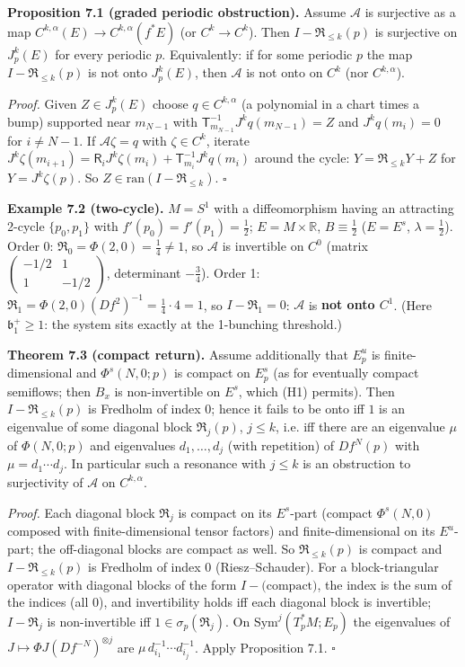 \documentclass[11pt,a4paper]{article}
\theoremstyle{plain}
\theoremstyle{definition}
\theoremstyle{remark}
\numberwithin{equation}{section}
\numberwithin{figure}{section}
\begin{document}
\textbf{Proposition 7.1 (graded periodic obstruction).} Assume $\mathcal A$ is surjective as a map $C^{k,\alpha}(E)\to C^{k,\alpha}(f^*E)$ (or $C^k\to C^k$). Then $I-\mathfrak R_{\le k}(p)$ is surjective on $J^k_p(E)$ for every periodic $p$. Equivalently: if for some periodic $p$ the map $I-\mathfrak R_{\le k}(p)$ is not onto $J^k_p(E)$, then $\mathcal A$ is not onto on $C^k$ (nor $C^{k,\alpha}$).

\textit{Proof.} Given $Z\in J^k_p(E)$ choose $q\in C^{k,\alpha}$ (a polynomial in a chart times a bump) supported near $m_{N-1}$ with $\mathsf T_{m_{N-1}}^{-1}J^kq(m_{N-1})=Z$ and $J^kq(m_i)=0$ for $i\ne N-1$. If $\mathcal A\zeta=q$ with $\zeta\in C^k$, iterate $J^k\zeta(m_{i+1})=\mathsf R_iJ^k\zeta(m_i)+\mathsf T^{-1}_{m_i}J^kq(m_i)$ around the cycle: $Y=\mathfrak R_{\le k}Y+Z$ for $Y=J^k\zeta(p)$. So $Z\in\mathrm{ran}(I-\mathfrak R_{\le k})$. $\square$

\textbf{Example 7.2 (two-cycle).} $M=S^1$ with a diffeomorphism having an attracting 2-cycle $\{p_0,p_1\}$ with $f'(p_0)=f'(p_1)=\tfrac12$; $E=M\times\mathbb R$, $B\equiv\tfrac12$ ($E=E^s$, $\lambda=\tfrac12$). Order 0: $\mathfrak R_0=\Phi(2,0)=\tfrac14\ne1$, so $\mathcal A$ is invertible on $C^0$ (matrix $\begin{pmatrix}-1/2&1\\1&-1/2\end{pmatrix}$, determinant $-\tfrac34$). Order 1: $\mathfrak R_1=\Phi(2,0)(Df^2)^{-1}=\tfrac14\cdot4=1$, so $I-\mathfrak R_1=0$: $\mathcal A$ is \textbf{not onto $C^1$}. (Here $\mathfrak b_1^+\ge1$: the system sits exactly at the 1-bunching threshold.)

\textbf{Theorem 7.3 (compact return).} Assume additionally that $E^u_p$ is finite-dimensional and $\Phi^s(N,0;p)$ is compact on $E^s_p$ (as for eventually compact semiflows; then $B_x$ is non-invertible on $E^s$, which (H1) permits). Then $I-\mathfrak R_{\le k}(p)$ is Fredholm of index $0$; hence it fails to be onto iff $1$ is an eigenvalue of some diagonal block $\mathfrak R_j(p)$, $j\le k$, i.e. iff there are an eigenvalue $\mu$ of $\Phi(N,0;p)$ and eigenvalues $d_1,\dots,d_j$ (with repetition) of $Df^N(p)$ with $\mu=d_1\cdots d_j$. In particular such a resonance with $j\le k$ is an obstruction to surjectivity of $\mathcal A$ on $C^{k,\alpha}$.

\textit{Proof.} Each diagonal block $\mathfrak R_j$ is compact on its $E^s$-part (compact $\Phi^s(N,0)$ composed with finite-dimensional tensor factors) and finite-dimensional on its $E^u$-part; the off-diagonal blocks are compact as well. So $\mathfrak R_{\le k}(p)$ is compact and $I-\mathfrak R_{\le k}(p)$ is Fredholm of index $0$ (Riesz–Schauder). For a block-triangular operator with diagonal blocks of the form $I-\text{(compact)}$, the index is the sum of the indices (all $0$), and invertibility holds iff each diagonal block is invertible; $I-\mathfrak R_j$ is non-invertible iff $1\in\sigma_p(\mathfrak R_j)$. On $\mathrm{Sym}^j(T^*_pM;E_p)$ the eigenvalues of $J\mapsto\Phi J(Df^{-N})^{\otimes j}$ are $\mu\,d_{i_1}^{-1}\cdots d_{i_j}^{-1}$. Apply Proposition 7.1. $\square$
\end{document}
